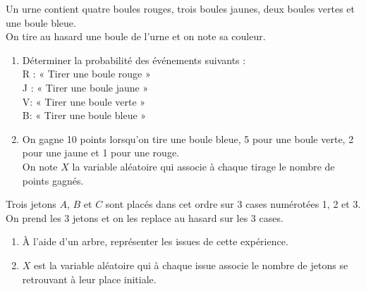 \documentclass[a4paper,11pt,exos]{nsi} %
\begin{document}
\exo{}
Un urne contient quatre boules rouges, trois boules jaunes, deux boules vertes et une boule bleue.\\
On tire au hasard une boule de l'urne et on note sa couleur.
\begin{enumerate}
	\item 	Déterminer la probabilité des événements suivants :\\
	R : « Tirer une boule rouge »\\
	J : « Tirer une boule jaune »\\
	V: « Tirer une boule verte »\\
	B: « Tirer une boule bleue »
	\item 	On gagne 10 points lorsqu'on tire une boule bleue, 5 pour une boule verte, 2 pour une jaune et 1 pour une rouge.\\
	On note $X$ la variable aléatoire qui associe à chaque tirage le nombre de points gagnés.
\end{enumerate}


\exo{}
Trois jetons $A$, $B$ et $C$ sont placés dans cet ordre sur 3 cases numérotées 1, 2 et 3.\\
On prend les 3 jetons et on les replace au hasard sur les 3 cases.
\begin{enumerate}
	\item 	À l'aide d'un arbre, représenter les issues de cette expérience.
	\item 	$X$ est la variable aléatoire qui à chaque issue associe le nombre de jetons se retrouvant à leur place initiale.
\end{enumerate}
\end{document}
